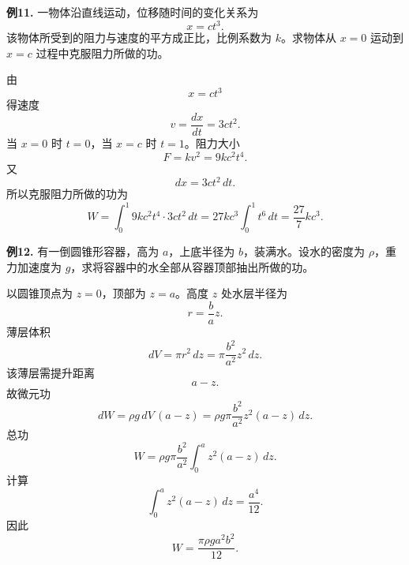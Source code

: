 \begin{problemblock}
\textbf{例11.} 一物体沿直线运动，位移随时间的变化关系为
\[
x=ct^3.
\]
该物体所受到的阻力与速度的平方成正比，比例系数为 \(k\)。求物体从 \(x=0\) 运动到 \(x=c\) 过程中克服阻力所做的功。
\end{problemblock}
\begin{solutionblock}
由
\[
x=ct^3
\]
得速度
\[
v=\frac{dx}{dt}=3ct^2.
\]
当 \(x=0\) 时 \(t=0\)，当 \(x=c\) 时 \(t=1\)。阻力大小
\[
F=kv^2=9kc^2t^4.
\]
又
\[
dx=3ct^2\,dt.
\]
所以克服阻力所做的功为
\[
W=\int_0^1 9kc^2t^4\cdot3ct^2\,dt
=27kc^3\int_0^1t^6\,dt
=\frac{27}{7}kc^3.
\]
\end{solutionblock}

\begin{problemblock}
\textbf{例12.} 有一倒圆锥形容器，高为 \(a\)，上底半径为 \(b\)，装满水。设水的密度为 \(\rho\)，重力加速度为 \(g\)，求将容器中的水全部从容器顶部抽出所做的功。
\end{problemblock}
\begin{solutionblock}
以圆锥顶点为 \(z=0\)，顶部为 \(z=a\)。高度 \(z\) 处水层半径为
\[
r=\frac{b}{a}z.
\]
薄层体积
\[
dV=\pi r^2\,dz=\pi\frac{b^2}{a^2}z^2\,dz.
\]
该薄层需提升距离
\[
a-z.
\]
故微元功
\[
dW=\rho g\,dV\,(a-z)
=\rho g\pi\frac{b^2}{a^2}z^2(a-z)\,dz.
\]
总功
\[
W=\rho g\pi\frac{b^2}{a^2}\int_0^a z^2(a-z)\,dz.
\]
计算
\[
\int_0^a z^2(a-z)\,dz
=\frac{a^4}{12}.
\]
因此
\[
W=\frac{\pi\rho g a^2b^2}{12}.
\]
\end{solutionblock}

